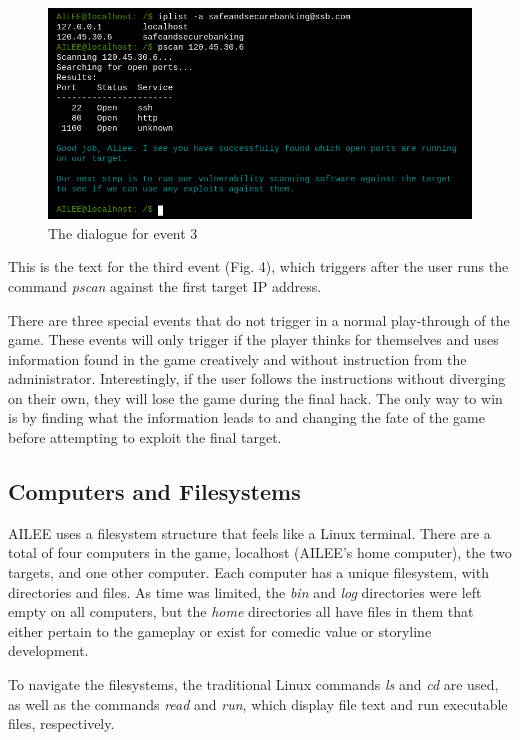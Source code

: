 \documentclass[conference]{IEEEtran}
\begin{document}
\begin{figure}[htbp]
	\centerline{\includegraphics[scale=1.39]{event3}}
	\caption{The dialogue for event 3}
	\label{fig}
\end{figure}

This is the text for the third event (Fig. 4), which triggers after the user runs the command \textit{pscan} against the first target IP address.

There are three special events that do not trigger in a normal play-through of the game. These events will only trigger if the player thinks for themselves and uses information found in the game creatively and without instruction from the administrator. Interestingly, if the user follows the instructions without diverging on their own, they will lose the game during the final hack. The only way to win is by finding what the information leads to and changing the fate of the game before attempting to exploit the final target.

\subsection{Computers and Filesystems}
AILEE uses a filesystem structure that feels like a Linux terminal. There are a total of four computers in the game, localhost (AILEE's home computer), the two targets, and one other computer. Each computer has a unique filesystem, with directories and files. As time was limited, the \textit{bin} and \textit{log} directories were left empty on all computers, but the \textit{home} directories all have files in them that either pertain to the gameplay or exist for comedic value or storyline development.

To navigate the filesystems, the traditional Linux commands \textit{ls} and \textit{cd} are used, as well as the commands \textit{read} and \textit{run}, which display file text and run executable files, respectively. 
\end{document}

